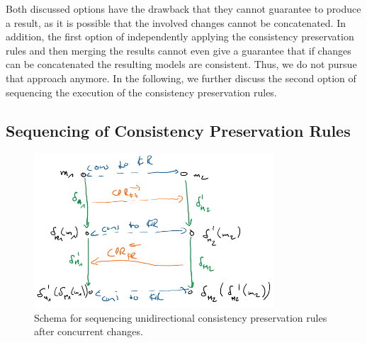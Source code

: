 Both discussed options have the drawback that they cannot guarantee to produce a result, as it is possible that the involved changes cannot be concatenated.
In addition, the first option of independently applying the consistency preservation rules and then merging the results cannot even give a guarantee that if changes can be concatenated the resulting models are consistent.
Thus, we do not pursue that approach anymore.
In the following, we further discuss the second option of sequencing the execution of the consistency preservation rules.



\subsection{Sequencing of Consistency Preservation Rules}
\label{chap:synchronization:combination:sequencing}

\begin{figure}
    \centering
    \includegraphics[width=0.8\textwidth]{figures/correctness/synchronization/sequencing_schema.png}
    \caption[Sequencing unidirectional consistency preservation rules]{Schema for sequencing unidirectional consistency preservation rules after concurrent changes.}
    \label{fig:synchronization:sequencing_schema}
\end{figure}

